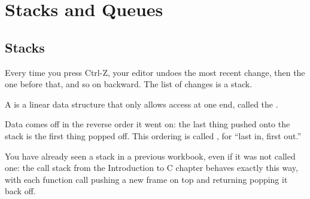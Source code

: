 \chapter{Stacks and Queues}

\section{Stacks}

Every time you press Ctrl-Z, your editor undoes the most recent change, then the one before that, and so on backward. The list of changes is a stack.

A  is a linear data structure that only allows access at one end, called the . 

Data comes off in the reverse order it went on: the last thing pushed onto the stack is the first thing popped off. This ordering is called , for ``last in, first out.'' 

You have already seen a stack in a previous workbook, even if it was not called one: the call stack from the Introduction to C chapter behaves exactly this way, with each function call pushing a new frame on top and returning popping it back off.

